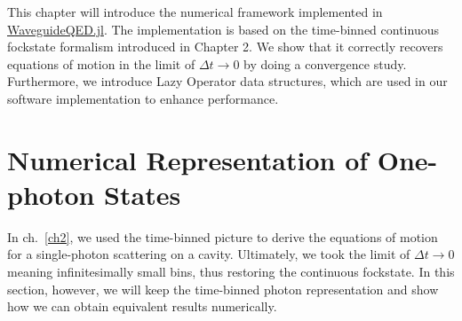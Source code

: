 This chapter will introduce the numerical framework implemented in \href{https://qojulia.github.io/WaveguideQED.jl/dev/}{WaveguideQED.jl}. The implementation is based on the time-binned continuous fockstate formalism introduced in Chapter 2. We show that it correctly recovers equations of motion in the limit of $\Delta t \rightarrow 0$ by doing a convergence study. Furthermore, we introduce Lazy Operator data structures, which are used in our software implementation to enhance performance.   

\section{Numerical Representation of One-photon States} \label{sec:onephoton_numerical}
In ch.~\ref{ch2}, we used the time-binned picture to derive the equations of motion for a single-photon scattering on a cavity. Ultimately, we took the limit of $\Delta t \rightarrow 0$ meaning infinitesimally small bins, thus restoring the continuous fockstate. In this section, however, we will keep the time-binned photon representation and show how we can obtain equivalent results numerically. 

